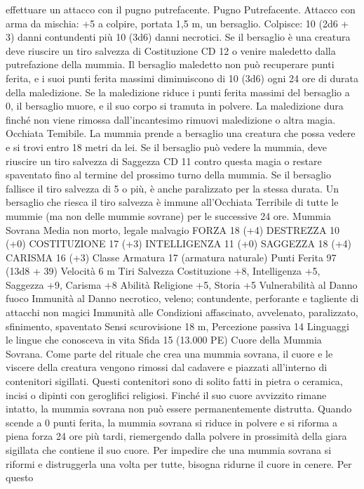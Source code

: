 \begin{multicols}{2}
effettuare un attacco con il pugno putrefacente.
Pugno Putrefacente. Attacco con arma da mischia: +5 a colpire,
portata 1,5 m, un bersaglio.
Colpisce: 10 (2d6 + 3) danni contundenti più 10 (3d6) danni
necrotici. Se il bersaglio è una creatura deve riuscire un tiro
salvezza di Costituzione CD 12 o venire maledetto dalla
putrefazione della mummia. Il bersaglio maledetto non può
recuperare punti ferita, e i suoi punti ferita massimi diminuiscono
di 10 (3d6) ogni 24 ore di durata della maledizione. Se la
maledizione riduce i punti ferita massimi del bersaglio a 0, il
bersaglio muore, e il suo corpo si tramuta in polvere. La
maledizione dura finché non viene rimossa dall’incantesimo
rimuovi maledizione o altra magia.
Occhiata Temibile. La mummia prende a bersaglio una creatura
che possa vedere e si trovi entro 18 metri da lei. Se il bersaglio
può vedere la mummia, deve riuscire un tiro salvezza di
Saggezza CD 11 contro questa magia o restare spaventato fino al
termine del prossimo turno della mummia. Se il bersaglio fallisce
il tiro salvezza di 5 o più, è anche paralizzato per la stessa durata.
Un bersaglio che riesca il tiro salvezza è immune all’Occhiata
Terribile di tutte le mummie (ma non delle mummie sovrane) per
le successive 24 ore.
Mummia Sovrana
Media non morto, legale malvagio
FORZA 18 (+4)
DESTREZZA 10 (+0)
COSTITUZIONE 17 (+3)
INTELLIGENZA 11 (+0)
SAGGEZZA 18 (+4)
CARISMA 16 (+3)
Classe Armatura 17 (armatura naturale)
Punti Ferita 97 (13d8 + 39)
Velocità 6 m
Tiri Salvezza Costituzione +8, Intelligenza +5, Saggezza +9,
Carisma +8
Abilità Religione +5, Storia +5
Vulnerabilità al Danno fuoco
Immunità al Danno necrotico, veleno; contundente, perforante
e tagliente di attacchi non magici
Immunità alle Condizioni affascinato, avvelenato, paralizzato,
sfinimento, spaventato
Sensi scurovisione 18 m, Percezione passiva 14
Linguaggi le lingue che conosceva in vita
Sfida 15 (13.000 PE)
Cuore della Mummia Sovrana. Come parte del rituale che crea
una mummia sovrana, il cuore e le viscere della creatura
vengono rimossi dal cadavere e piazzati all’interno di contenitori
sigillati. Questi contenitori sono di solito fatti in pietra o
ceramica, incisi o dipinti con geroglifici religiosi.
Finché il suo cuore avvizzito rimane intatto, la mummia sovrana
non può essere permanentemente distrutta. Quando scende a 0
punti ferita, la mummia sovrana si riduce in polvere e si riforma
a piena forza 24 ore più tardi, riemergendo dalla polvere in
prossimità della giara sigillata che contiene il suo cuore. Per
impedire che una mummia sovrana si riformi e distruggerla una
volta per tutte, bisogna ridurne il cuore in cenere. Per questo

\end{multicols}

